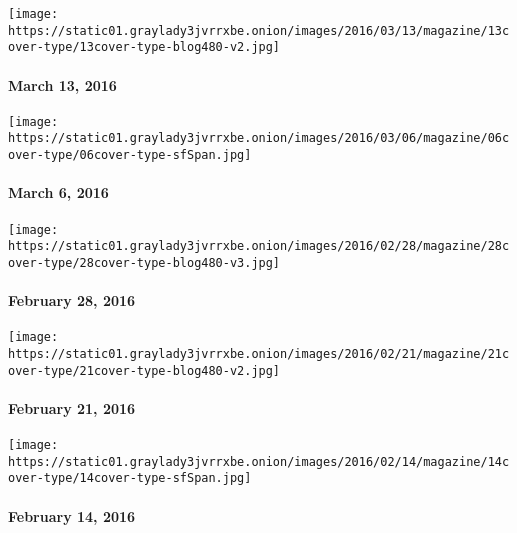 \href{http://www.nytimes3xbfgragh.onion/indexes/2016/03/17/magazine/index.html}{}

\texttt{[image: https://static01.graylady3jvrrxbe.onion/images/2016/03/13/magazine/13cover-type/13cover-type-blog480-v2.jpg]}

\hypertarget{march-13-2016}{%
\paragraph{March 13, 2016}\label{march-13-2016}}

\href{http://www.nytimes3xbfgragh.onion/indexes/2016/03/06/magazine/index.html}{}

\texttt{[image: https://static01.graylady3jvrrxbe.onion/images/2016/03/06/magazine/06cover-type/06cover-type-sfSpan.jpg]}

\hypertarget{march-6-2016}{%
\paragraph{March 6, 2016}\label{march-6-2016}}

\href{http://www.nytimes3xbfgragh.onion/indexes/2016/02/28/magazine/index.html}{}

\texttt{[image: https://static01.graylady3jvrrxbe.onion/images/2016/02/28/magazine/28cover-type/28cover-type-blog480-v3.jpg]}

\hypertarget{february-28-2016}{%
\paragraph{February 28, 2016}\label{february-28-2016}}

\href{http://www.nytimes3xbfgragh.onion/indexes/2016/02/22/magazine/index.html}{}

\texttt{[image: https://static01.graylady3jvrrxbe.onion/images/2016/02/21/magazine/21cover-type/21cover-type-blog480-v2.jpg]}

\hypertarget{february-21-2016}{%
\paragraph{February 21, 2016}\label{february-21-2016}}

\href{http://www.nytimes3xbfgragh.onion/indexes/2016/02/14/magazine/index.html}{}

\texttt{[image: https://static01.graylady3jvrrxbe.onion/images/2016/02/14/magazine/14cover-type/14cover-type-sfSpan.jpg]}

\hypertarget{february-14-2016}{%
\paragraph{February 14, 2016}\label{february-14-2016}}

